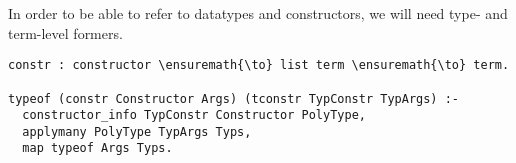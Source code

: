 In order to be able to refer to datatypes and constructors, we will need
type- and term-level formers.

\begin{verbatim}
constr : constructor \ensuremath{\to} list term \ensuremath{\to} term.

typeof (constr Constructor Args) (tconstr TypConstr TypArgs) :-
  constructor_info TypConstr Constructor PolyType,
  applymany PolyType TypArgs Typs,
  map typeof Args Typs.
\end{verbatim}
